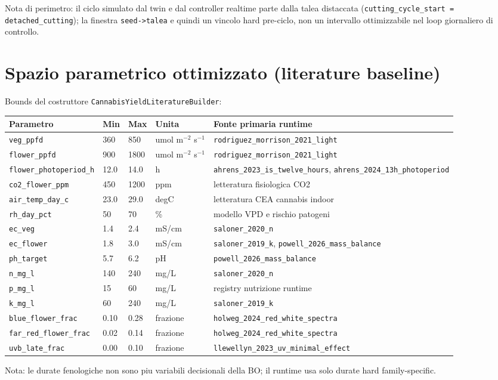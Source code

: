 ﻿\documentclass[11pt,a4paper]{report}
\begin{document}
Nota di perimetro: il ciclo simulato dal twin e dal controller realtime parte dalla talea distaccata
(\texttt{cutting\_cycle\_start = detached\_cutting}); la finestra \texttt{seed->talea} e quindi un vincolo hard pre-ciclo,
non un intervallo ottimizzabile nel loop giornaliero di controllo.

\section{Spazio parametrico ottimizzato (literature baseline)}
Bounds del costruttore \texttt{CannabisYieldLiteratureBuilder}:
\begin{longtable}{@{}p{3.4cm}p{1.2cm}p{1.2cm}p{2.0cm}p{5.0cm}@{}}
\toprule
Parametro & Min & Max & Unita & Fonte primaria runtime \\ \midrule
\texttt{veg\_ppfd} & 360 & 850 & umol m$^{-2}$ s$^{-1}$ & \texttt{rodriguez\_morrison\_2021\_light} \\
\texttt{flower\_ppfd} & 900 & 1800 & umol m$^{-2}$ s$^{-1}$ & \texttt{rodriguez\_morrison\_2021\_light} \\
\texttt{flower\_photoperiod\_h} & 12.0 & 14.0 & h & \texttt{ahrens\_2023\_is\_twelve\_hours}, \texttt{ahrens\_2024\_13h\_photoperiod} \\
\texttt{co2\_flower\_ppm} & 450 & 1200 & ppm & letteratura fisiologica CO2 \\
\texttt{air\_temp\_day\_c} & 23.0 & 29.0 & degC & letteratura CEA cannabis indoor \\
\texttt{rh\_day\_pct} & 50 & 70 & \% & modello VPD e rischio patogeni \\
\texttt{ec\_veg} & 1.4 & 2.4 & mS/cm & \texttt{saloner\_2020\_n} \\
\texttt{ec\_flower} & 1.8 & 3.0 & mS/cm & \texttt{saloner\_2019\_k}, \texttt{powell\_2026\_mass\_balance} \\
\texttt{ph\_target} & 5.7 & 6.2 & pH & \texttt{powell\_2026\_mass\_balance} \\
\texttt{n\_mg\_l} & 140 & 240 & mg/L & \texttt{saloner\_2020\_n} \\
\texttt{p\_mg\_l} & 15 & 60 & mg/L & registry nutrizione runtime \\
\texttt{k\_mg\_l} & 60 & 240 & mg/L & \texttt{saloner\_2019\_k} \\
\texttt{blue\_flower\_frac} & 0.10 & 0.28 & frazione & \texttt{holweg\_2024\_red\_white\_spectra} \\
\texttt{far\_red\_flower\_frac} & 0.02 & 0.14 & frazione & \texttt{holweg\_2024\_red\_white\_spectra} \\
\texttt{uvb\_late\_frac} & 0.00 & 0.10 & frazione & \texttt{llewellyn\_2023\_uv\_minimal\_effect} \\
\bottomrule
\end{longtable}
Nota: le durate fenologiche non sono piu variabili decisionali della BO; il runtime usa solo durate hard family-specific.
\end{document}
